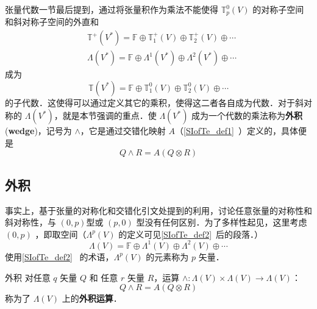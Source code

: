 
\begin{issues}
\issueMissDepend
{}
\end{issues}




张量代数一节最后提到，通过将张量积作为乘法不能使得 $\mathbb T_p^0(V)$ 的对称子空间和斜对称子空间的外直和 
\begin{equation}
\begin{aligned}
&\mathbb T^+(V^*)=\mathbb F\oplus\mathbb T_1^+(V)\oplus\mathbb T_2^+(V)\oplus\cdots\\
&\Lambda(V^*)=\mathbb F\oplus \Lambda^1(V^*)\oplus\Lambda^2(V^*)\oplus\cdots
\end{aligned}
\end{equation}
成为 
\begin{equation}
\mathbb T(V^*)=\mathbb F\oplus\mathbb T_1^0(V)\oplus\mathbb T_2^0(V)\oplus\cdots
\end{equation}
的子代数．这使得可以通过定义其它的乘积，使得这二者各自成为代数．对于斜对称的 $\Lambda(V^*)$，就是本节强调的重点．使 $\Lambda(V^*)$ 成为一个代数的乘法称为\textbf{外积}(\textbf{wedge})，记号为 $\wedge$，它是通过交错化映射 $A$（\autoref{SIofTe_def1}~）定义的，具体便是
\begin{equation}
Q\wedge R=A(Q\otimes R)
\end{equation}

\subsection{外积}
事实上，基于张量的对称化和交错化引文处提到的利用，讨论任意张量的对称性和斜对称性，与 $(0,p)$型或 $(p,0)$ 型没有任何区别．为了多样性起见，这里考虑 $(0,p)$ ，即取空间（$\Lambda^p(V)$ 的定义可见\autoref{SIofTe_def2}~后的段落．） 
\begin{equation}
\Lambda(V)=\mathbb F\oplus \Lambda^1(V)\oplus\Lambda^2(V)\oplus\cdots
\end{equation}
使用\autoref{SIofTe_def2}~ 的术语，$\Lambda^p(V)$ 的元素称为 $p$ 矢量．
\begin{definition}{外积}
对任意 $q$ 矢量 $Q$ 和 任意 $r$ 矢量 $R$，运算 $\wedge:\Lambda(V)\times\Lambda(V)\rightarrow\Lambda(V)$：
\begin{equation}
Q\wedge R=A(Q\otimes R)
\end{equation}
称为了 $\Lambda(V)$ 上的\textbf{外积运算}．
\end{definition}





